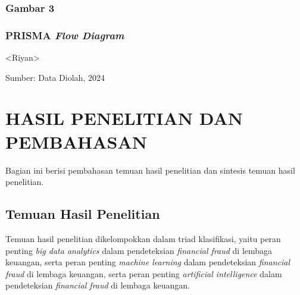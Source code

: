 \documentclass[12pt, a4paper]{article}
\begin{document}
\begin{center}
    \subsubsection*{Gambar 3}
    \subsubsection*{PRISMA \textit{Flow Diagram}}
    <Riyan>
\end{center}

\begin{flushleft}
Sumber: Data Diolah, 2024
\end{flushleft}

\section*{HASIL PENELITIAN DAN PEMBAHASAN}
\hspace{1cm}Bagian ini berisi pembahasan temuan hasil penelitian dan sintesis temuan hasil penelitian.

\subsection*{Temuan Hasil Penelitian}
\hspace{1cm}Temuan hasil penelitian dikelompokkan dalam triad klasifikasi, yaitu peran penting
\textit{big data analytics} dalam pendeteksian \textit{financial fraud} di lembaga keuangan,
serta peran penting \textit{machine learning} dalam pendeteksian \textit{financial fraud} di lembaga keuangan,
serta peran penting \textit{artificial intelligence} dalam pendeteksian \textit{financial fraud} di lembaga keuangan.
\end{document}
